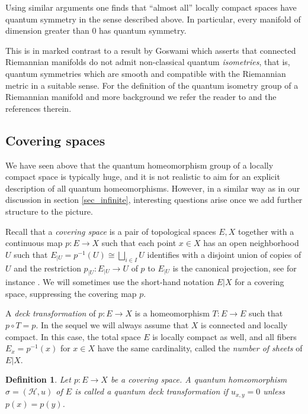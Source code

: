 \documentclass[a4paper]{amsart}
\newcommand*{\Hc}{\mathcal{H}}
\numberwithin{equation}{section}
\theoremstyle{change}
\newtheorem{definition}[theorem]{Definition}
\begin{document}
Using similar arguments one finds that ``almost all'' locally compact spaces have quantum symmetry in the sense described above. In particular, every manifold of dimension greater than $ 0 $ has quantum symmetry. 

This is in marked contrast to a result by Goswami \cite{GOSWAMI_nonexistence} which asserts that connected Riemannian manifolds do not 
admit non-classical quantum \emph{isometries}, that is, quantum symmetries which are smooth and compatible with the Riemannian metric in a suitable sense. 
For the definition of the quantum isometry group of a Riemannian manifold and more background we refer the reader to \cite{GOSWAMI_nonexistence} and the references therein. 


\subsection{Covering spaces} 

We have seen above that the quantum homeomorphism group of a locally compact space is typically huge, and it is not realistic to aim for an explicit description of all quantum homeomorphisms. However, in a similar way as in our discussion in section \ref{sec_infinite}, interesting questions arise once we add further structure to the picture. 

Recall that a \emph{covering space} is a pair of topological spaces $ E,X $ together with a continuous map $ p: E \rightarrow X $ such that each point $ x \in X $ 
has an open neighborhood $ U $ such that $ E_{|U} = p^{-1}(U) \cong \bigsqcup_{i \in I} U $ identifies with a disjoint union of copies of $ U $ and the restriction $ p_{|U}: E_{|U} \rightarrow U $ 
of $ p $ to $ E_{|U} $ is the canonical projection,  see for instance \cite[Section 1.3]{HATCHER_book}. We will sometimes use the short-hand notation $ E|X $ for a covering space, suppressing the covering map $ p $. 

A \emph{deck transformation} of $ p: E \rightarrow X $ is a homeomorphism $ T: E \rightarrow E $ such that $ p \circ T = p $. 
In the sequel we will always assume that $ X $ is connected and locally compact. In this case, the total space $ E $ is locally compact as well, 
and all fibers $ E_x = p^{-1}(x) $ for $ x \in X $ have the same cardinality, called the \emph{number of sheets} of $ E|X $. 

\begin{definition} 
Let $ p: E \rightarrow X $ be a covering space. A quantum homeomorphism $ \sigma = (\Hc, u) $ of $ E $ is called a quantum deck transformation 
if $ u_{x, y} = 0 $ unless $ p(x) = p(y) $. 
\end{definition} 
\end{document}

